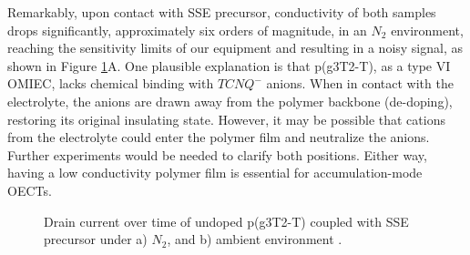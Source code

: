 Remarkably, upon contact with SSE precursor, conductivity of both samples drops significantly, approximately six orders of magnitude, in an $N_{2}$ environment, reaching the sensitivity limits of our equipment and resulting in a noisy signal, as shown in Figure \ref{fig:revox1}A. One plausible explanation is that p(g3T2-T), as a type VI OMIEC, lacks chemical binding with $TCNQ^{-}$ anions. When in contact with the electrolyte, the anions are drawn away from the polymer backbone (de-doping), restoring its original insulating state. However, it may be possible that cations from the electrolyte could enter the polymer film and neutralize the anions. Further experiments would be needed to clarify both positions. Either way, having a low conductivity polymer film is essential for accumulation-mode OECTs.

\begin{figure}[ht]
    \centering
    \caption[Drain current over time of undoped-p(g3T2-T) coupled with SSE precursor]{Drain current over time of undoped p(g3T2-T) coupled with SSE precursor under a) $N_{2}$, and b) ambient environment%
    .}
    \label{fig:revox1}
\end{figure}

